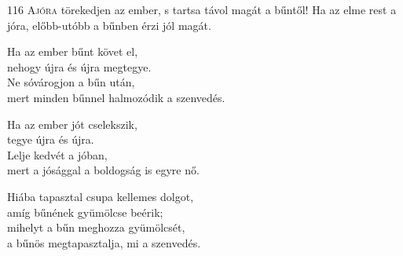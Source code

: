 
\begin{firstdhpverse}[-2pt]{116}
\lettrine[slope=0.5em]{A}{jóra} {\LettrineTextFont törekedjen az ember,}\newline
s tartsa távol magát a bűntől!\newline
Ha az elme rest a jóra,\newline
előbb-utóbb a bűnben érzi jól magát.
\end{firstdhpverse}

\begin{dhpverse}

 Ha az ember bűnt követ el,\\
nehogy újra és újra megtegye.\\
Ne sóvárogjon a bűn után,\\
mert minden bűnnel halmozódik a szenvedés.

 Ha az ember jót cselekszik,\\
tegye újra és újra.\\
Lelje kedvét a jóban,\\
mert a jósággal a boldogság is egyre nő.

 Hiába tapasztal csupa kellemes dolgot,\\
amíg bűnének gyümölcse beérik;\\
mihelyt a bűn meghozza gyümölcsét,\\
a bűnös megtapasztalja, mi a szenvedés.

\end{dhpverse}
\newpage
